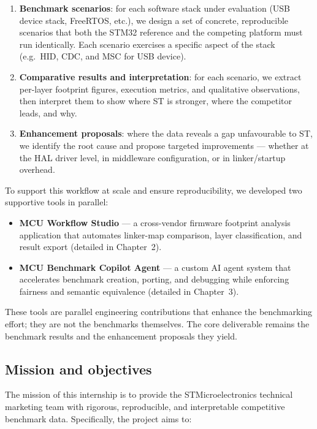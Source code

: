 \begin{enumerate}
\item \textbf{Benchmark scenarios}: for each software stack under evaluation (USB device
stack, FreeRTOS, etc.), we design a set of concrete, reproducible scenarios that both the
STM32 reference and the competing platform must run identically. Each scenario exercises a
specific aspect of the stack (e.g.\ HID, CDC, and MSC for USB device).
\item \textbf{Comparative results and interpretation}: for each scenario, we extract
per-layer footprint figures, execution metrics, and qualitative observations, then
interpret them to show where ST is stronger, where the competitor leads, and why.
\item \textbf{Enhancement proposals}: where the data reveals a gap unfavourable to ST, we
identify the root cause and propose targeted improvements --- whether at the HAL driver
level, in middleware configuration, or in linker/startup overhead.
\end{enumerate}

To support this workflow at scale and ensure reproducibility, we developed two supportive
tools in parallel:

\begin{itemize}
\item \textbf{MCU Workflow Studio} --- a cross-vendor firmware footprint analysis
application that automates linker-map comparison, layer classification, and result export
(detailed in Chapter~2).
\item \textbf{MCU Benchmark Copilot Agent} --- a custom AI agent system that accelerates
benchmark creation, porting, and debugging while enforcing fairness and semantic
equivalence (detailed in Chapter~3).
\end{itemize}

These tools are parallel engineering contributions that enhance the benchmarking effort;
they are not the benchmarks themselves. The core deliverable remains the benchmark results
and the enhancement proposals they yield.

\subsection{Mission and objectives}
\label{sec:objectives}

The mission of this internship is to provide the STMicroelectronics technical marketing
team with rigorous, reproducible, and interpretable competitive benchmark data. Specifically,
the project aims to:

